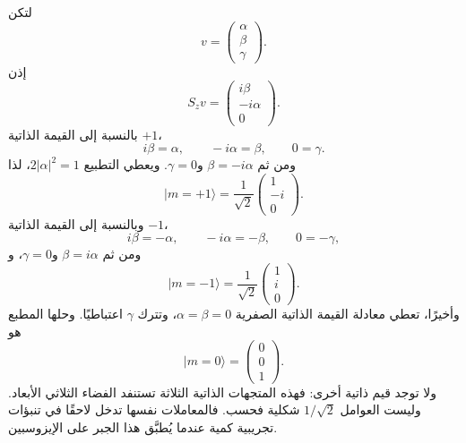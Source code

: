 لتكن
\begin{equation}
v=
\begin{pmatrix}
\alpha\\
\beta\\
\gamma
\end{pmatrix}.
\end{equation}
إذن
\begin{equation}
S_zv
=
\begin{pmatrix}
i\beta\\
-i\alpha\\
0
\end{pmatrix}.
\end{equation}
بالنسبة إلى القيمة الذاتية \(+1\)،
\begin{equation}
i\beta=\alpha,
\qquad
-i\alpha=\beta,
\qquad
0=\gamma.
\end{equation}
ومن ثم \(\beta=-i\alpha\) و\(\gamma=0\). ويعطي التطبيع \(2|\alpha|^2=1\)، لذا
\begin{equation}
|m=+1\rangle
=
\frac{1}{\sqrt2}
\begin{pmatrix}
1\\
-i\\
0
\end{pmatrix}.
\end{equation}
وبالنسبة إلى القيمة الذاتية \(-1\)،
\begin{equation}
i\beta=-\alpha,
\qquad
-i\alpha=-\beta,
\qquad
0=-\gamma,
\end{equation}
ومن ثم \(\beta=i\alpha\) و\(\gamma=0\)، و
\begin{equation}
|m=-1\rangle
=
\frac{1}{\sqrt2}
\begin{pmatrix}
1\\
i\\
0
\end{pmatrix}.
\end{equation}
وأخيرًا، تعطي معادلة القيمة الذاتية الصفرية \(\alpha=\beta=0\)، وتترك \(\gamma\) اعتباطيًا. وحلها المطبع هو
\begin{equation}
|m=0\rangle
=
\begin{pmatrix}
0\\
0\\
1
\end{pmatrix}.
\end{equation}
ولا توجد قيم ذاتية أخرى: فهذه المتجهات الذاتية الثلاثة تستنفد الفضاء الثلاثي الأبعاد. وليست العوامل \(1/\sqrt2\) شكلية فحسب. فالمعاملات نفسها تدخل لاحقًا في تنبؤات تجريبية كمية عندما يُطبَّق هذا الجبر على الإيزوسبين.

\begin{classroomqa}
\end{classroomqa}

